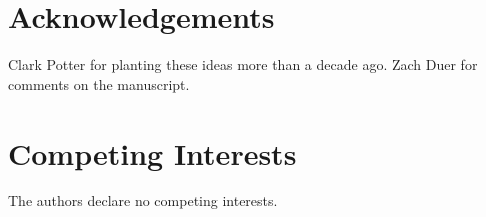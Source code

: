 \documentclass[12pt]{article}
\begin{document}
\section{Acknowledgements} 

Clark Potter for planting these ideas more than a decade ago. Zach Duer for comments on the manuscript.

\section{Competing Interests}

The authors declare no competing interests.


\end{document}
